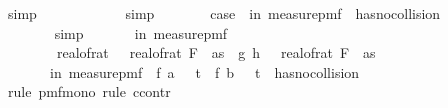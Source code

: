 \begin{isabellebody}
\ simp\isanewline
\ \ \ \ \isamarkupfalse%
\ \isamarkupfalse%
\ {\isachardoublequoteopen}{\isachardot}{\kern0pt}{\isachardot}{\kern0pt}{\isachardot}{\kern0pt}\ {\isacharequal}{\kern0pt}\ {}{\isacharslash}{\kern0pt}{}{\isachardoublequoteclose}\ \isamarkupfalse%
\ {\isacharparenleft}{\kern0pt}simp{\isacharparenright}{\kern0pt}\isanewline
\ \ \ \ \isamarkupfalse%
\ \isamarkupfalse%
\ case{\isacharunderscore}{\kern0pt}{}{\isacharcolon}{\kern0pt}\ {\isachardoublequoteopen}{\isasymP}{\isacharparenleft}{\kern0pt}{\isasymomega}\ in\ measure{\isacharunderscore}{\kern0pt}pmf\ {\isasymOmega}\ {\isasymnot}has{\isacharunderscore}{\kern0pt}no{\isacharunderscore}{\kern0pt}collision\ {\isasymomega}{\isacharparenright}{\kern0pt}\ {\isasymle}\ {}{\isacharslash}{\kern0pt}{}{\isachardoublequoteclose}\ \isanewline
\ \ \ \ \ \ \isamarkupfalse%
\ simp\isanewline
\isanewline
\ \ \ \ \isamarkupfalse%
\ {\isachardoublequoteopen}{\isasymP}{\isacharparenleft}{\kern0pt}{\isasymomega}\ in\ measure{\isacharunderscore}{\kern0pt}pmf\ {\isasymOmega}\isanewline
\ \ \ \ \ \ \ \ real{\isacharunderscore}{\kern0pt}of{\isacharunderscore}{\kern0pt}rat\ {\isasymdelta}\ {\isacharasterisk}{\kern0pt}\ real{\isacharunderscore}{\kern0pt}of{\isacharunderscore}{\kern0pt}rat\ {\isacharparenleft}{\kern0pt}F\ {}\ as{\isacharparenright}{\kern0pt}\ {\isacharless}{\kern0pt}\ {\isasymbar}g{\isacharprime}{\kern0pt}\ {\isacharparenleft}{\kern0pt}h\ {\isasymomega}{\isacharparenright}{\kern0pt}\ {\isacharminus}{\kern0pt}\ real{\isacharunderscore}{\kern0pt}of{\isacharunderscore}{\kern0pt}rat\ {\isacharparenleft}{\kern0pt}F\ {}\ as{\isacharparenright}{\kern0pt}{\isasymbar}{\isacharparenright}{\kern0pt}\ {\isasymle}\ \isanewline
\ \ \ \ \ \ {\isasymP}{\isacharparenleft}{\kern0pt}{\isasymomega}\ in\ measure{\isacharunderscore}{\kern0pt}pmf\ {\isasymOmega}\ f\ a\ {\isasymomega}\ {\isasymge}\ t\ {\isasymor}\ f\ b\ {\isasymomega}\ {\isacharless}{\kern0pt}\ t\ {\isasymor}\ {\isasymnot}{\isacharparenleft}{\kern0pt}has{\isacharunderscore}{\kern0pt}no{\isacharunderscore}{\kern0pt}collision\ {\isasymomega}{\isacharparenright}{\kern0pt}{\isacharparenright}{\kern0pt}{\isachardoublequoteclose}\isanewline
\ \ \ \ \isamarkupfalse%
\ {\isacharparenleft}{\kern0pt}rule\ pmf{\isacharunderscore}{\kern0pt}mono{\isacharunderscore}{\kern0pt}{}{\isacharcomma}{\kern0pt}\ rule\ ccontr{\isacharparenright}{\kern0pt}\isanewline

\end{isabellebody}
